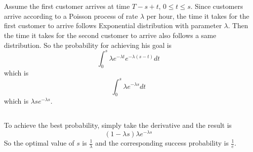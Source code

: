 \documentclass[12pt,letterpaper]{article}
\begin{document}
\section{}
\subsection{}
Assume the first customer arrives at time $T-s+t$, $0 \leq t\leq s$.
Since customers arrive according to a Poisson process of rate $\lambda$ per hour,
the time it takes for the first customer to arrive follows Exponential distribution with parameter $\lambda$.
Then the time it takes for the second customer to arrive also follows a same distribution.
So the probability for achieving his goal is 
$$\int_{0}^{s}\lambda e^{-\lambda t}e^{-\lambda(s-t)}dt$$
which is 
$$\int_{0}^{s}\lambda e^{-\lambda s}dt$$
which is $\lambda se^{-\lambda s}$.
\subsection{}
To achieve the best probability, 
simply take the derivative and the result is 
$$(1-\lambda s)\lambda e^{-\lambda s}$$
So the optimal value of $s$ is $\frac{1}{\lambda}$ 
and the corresponding success probability is $\frac{1}{e}$.
\section{}

\subsection{}

\subsection{}

\subsection{}
\end{document}

